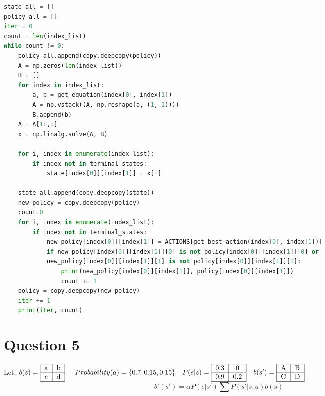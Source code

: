 \documentclass[letter, 10pt]{article}
\begin{document}
\begin{lstlisting}[language=Python]
state_all = []
policy_all = []
iter = 0
count = len(index_list)
while count != 0:
    policy_all.append(copy.deepcopy(policy))
    A = np.zeros(len(index_list))
    B = []
    for index in index_list:
        a, b = get_equation(index[0], index[1])
        A = np.vstack((A, np.reshape(a, (1,-1))))
        B.append(b)
    A = A[1:,:]
    x = np.linalg.solve(A, B)

    for i, index in enumerate(index_list):
        if index not in terminal_states:
            state[index[0]][index[1]] = x[i]
    
    state_all.append(copy.deepcopy(state))
    new_policy = copy.deepcopy(policy)
    count=0
    for i, index in enumerate(index_list):
        if index not in terminal_states:
            new_policy[index[0]][index[1]] = ACTIONS[get_best_action(index[0], index[1])]
            if new_policy[index[0]][index[1]][0] is not policy[index[0]][index[1]][0] or 
            new_policy[index[0]][index[1]][1] is not policy[index[0]][index[1]][1]:
                print(new_policy[index[0]][index[1]], policy[index[0]][index[1]])
                count += 1
    policy = copy.deepcopy(new_policy)
    iter += 1
    print(iter, count)
\end{lstlisting}
\newpage

\section*{Question 5}
Let,
$b(s) = \begin{tabular}{ |c|c| } 
                    \hline
                    a & b\\
                    \hline
                    c & d\\
                    \hline
                \end{tabular},\quad
Probability(a) = \{0.7, 0.15, 0.15\}\quad
P(e|s) = \begin{tabular}{ |c|c| } 
            \hline
            0.3 & 0\\
            \hline
            0.9 & 0.2\\
            \hline
        \end{tabular}\quad
b(s') = \begin{tabular}{ |c|c| } 
            \hline
            A & B\\
            \hline
            C & D\\
            \hline
        \end{tabular}$
\\
\begin{equation*}
    b'(s') = \alpha P(e|s')\sum P(s'|s,a)b(s)    
\end{equation*}
\end{document}
